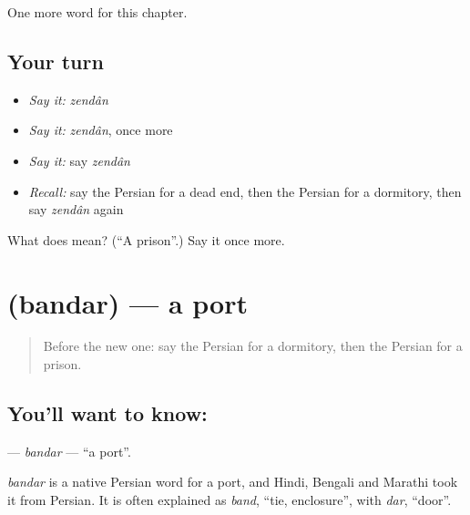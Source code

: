 \begin{grammarlens}[title={What you've built}]
One more word for this chapter.
\end{grammarlens}

\subsection*{Your turn}
\begin{itemize}
\raggedright
  \item \emph{Say it:} \emph{zendân}
  \item \emph{Say it:} \emph{zendân}, once more
  \item \emph{Say it:} say \emph{zendân}
  \item \emph{Recall:} say the Persian for a dead end, then the Persian for a dormitory, then say \emph{zendân} again
\end{itemize}

\begin{tcolorbox}[breakable,colback=teal!4,colframe=teal!35!black,title={Before you move on}]
What does  mean? (\textquotedblleft{}A prison\textquotedblright{}.) Say it once more.
\end{tcolorbox}
\section[\texorpdfstring{\fa{بندر} (bandar)}{بندر (bandar)}]{ (bandar) — a port}

\label{lesson:FA-C157-bandar}



\begin{quote}
Before the new one: say the Persian for a dormitory, then the Persian for a prison.
\end{quote}

\subsection*{You'll want to know: }
\textbf{} — \emph{bandar} — \textquotedblleft{}a port\textquotedblright{}.

\begin{cousinweb}
\emph{bandar} is a native Persian word for a port, and Hindi, Bengali and Marathi took it from Persian. It is often explained as \emph{band}, \textquotedblleft{}tie, enclosure\textquotedblright{}, with \emph{dar}, \textquotedblleft{}door\textquotedblright{}.
\end{cousinweb}

